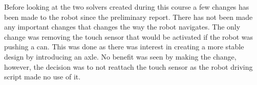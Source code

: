 \documentclass[../../main.tex]{subfiles}
\begin{document}
Before looking at the two solvers created during this course a few changes has been made to the robot since the preliminary report. There has not been made any important changes that changes the way the robot navigates. The only change was removing the touch sensor that would be activated if the robot was pushing a can. This was done as there was interest in creating a more stable design by introducing an axle. No benefit was seen by making the change, however, the decision was to not reattach the touch sensor as the robot driving script made no use of it.
\end{document}
